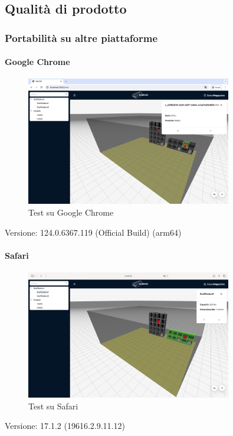 \newpage
\subsection{Qualità di prodotto}
\subsubsection{Portabilità su altre piattaforme}
\paragraph{Google Chrome}
\begin{figure}[h!] 
    \centering
    \includegraphics[width=0.8\textwidth]{images/chrome.png}
    \caption{Test su Google Chrome}
\end{figure}
Versione: 124.0.6367.119 (Official Build) (arm64)

\paragraph{Safari}
\begin{figure}[h!] 
    \centering
    \includegraphics[width=0.8\textwidth]{images/safari.png}
    \caption{Test su Safari}
\end{figure}
Versione: 17.1.2 (19616.2.9.11.12)


